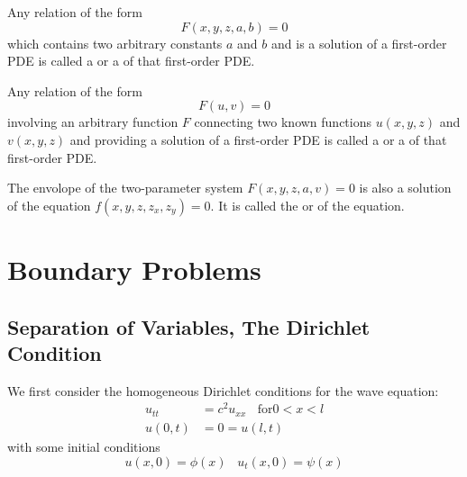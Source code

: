 \documentclass[12pt, a4paper, oneside, openright, titlepage]{book}
\begin{document}
\begin{defn}
    Any relation of the form \begin{equation*}
        F(x,y,z,a,b) = 0
    \end{equation*}
    which contains two arbitrary constants $a$ and $b$ and is a solution of a first-order PDE is called a  or a  of that first-order PDE.
\end{defn}

\begin{defn}
    Any relation of the form $$F(u,v) = 0$$ involving an arbitrary function $F$ connecting two known functions $u(x,y,z)$ and $v(x,y,z)$ and providing a solution of a first-order PDE is called a  or a  of that first-order PDE.
\end{defn}

\begin{defn}
    The envolope of the two-parameter system $F(x,y,z,a,v) = 0$ is also a solution of the equation $f(x,y,z,z_x,z_y) = 0$. It is called the  or  of the equation.
\end{defn}




\chapter{Boundary Problems}

\section{Separation of Variables, The Dirichlet Condition}

We first consider the homogeneous Dirichlet conditions for the wave equation: \begin{align}
    u_{tt} &= c^2u_{xx}\;\;\text{ for} 0 < x < l \label{al:bound_wave} \\
    u(0,t) &= 0 = u(l,t) \label{al:bound_wavedir}
\end{align}
with some initial conditions \begin{equation} \label{eq:bound_wave_initial}
    u(x,0) = \phi(x)\;\;\;u_t(x,0) = \psi(x)
\end{equation}
\end{document}
